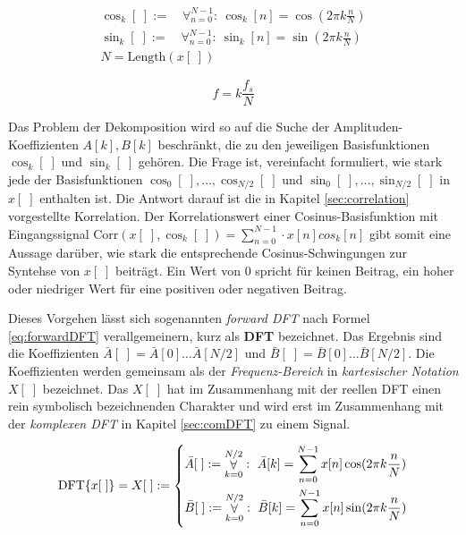\begin{equation}
\label{eq:baseFunctions}
\begin{split}
\cos_k[\;] := \quad \mathop{\forall}_{n = 0}^{N-1} :\ \cos_k[n] = \cos(2\pi k \frac{n}{N}) \\
\sin_k[\;] := \quad \mathop{\forall}_{n = 0}^{N-1} :\ \sin_k[n] = \sin(2\pi k \frac{n}{N}) \\
N = \text{Length} (x[\;] )
\end{split}
\end{equation} 

\begin{equation}
\label{eq:baseToFreq}
f = k\frac{f_s}{N} 
\end{equation} 

Das Problem der Dekomposition wird so auf die Suche der Amplituden-Koeffizienten $A[k], B[k]$ beschränkt, die zu den jeweiligen Basisfunktionen $\cos_k[\;]$ und $\sin_k[\;]$ gehören. Die Frage ist, vereinfacht formuliert, wie \glqq stark\grqq{} jede der Basisfunktionen $\cos_0[\;], \ldots ,\cos_{N/2}[\;]$ und $\sin_0[\;] ,\ldots ,\sin_{N/2}[\;]$ in $x[\;]$ enthalten ist.  Die Antwort darauf ist die in Kapitel \ref{sec:correlation} vorgestellte Korrelation. Der Korrelationswert einer Cosinus-Basisfunktion mit Eingangssignal Corr$(x[\;],\cos_k[\;]) = \sum_{n=0}^{N-1} \cdot x[n]cos_k[n]$ gibt somit eine Aussage darüber, wie stark die entsprechende Cosinus-Schwingungen zur Syntehse von $x[\;]$ beiträgt. Ein Wert von $0$ spricht für keinen Beitrag, ein hoher oder niedriger Wert für eine positiven oder negativen Beitrag. \cite[S. 157 - 158]{dspGuide}

Dieses Vorgehen lässt sich sogenannten \emph{forward DFT} nach Formel \ref{eq:forwardDFT} verallgemeinern, kurz als \textbf{DFT} bezeichnet. Das Ergebnis sind die Koeffizienten $\bar{A}[\;] = \bar{A}[0]\ldots \bar{A}[N/2]$ und $\bar{B}[\;] = \bar{B}[0] \ldots \bar{B}[N/2]$. Die Koeffizienten werden gemeinsam als der \emph{Frequenz-Bereich} in \emph{kartesischer Notation} $X[\;]$ bezeichnet. Das $X[\;]$ hat im Zusammenhang mit der reellen DFT einen rein symbolisch bezeichnenden Charakter und wird erst im Zusammenhang mit der \emph{komplexen DFT} in Kapitel \ref{sec:comDFT} zu einem Signal.  \cite[S. 158]{dspGuide}

\begin{equation}
\text{DFT}\{x[\;]\} = X[\;] :=
\begin{dcases}
\bar{A}[\;]  := \mathop{\forall}_{k = 0}^{N/2} :\ \bar{A}[k] = \sum_{n=0}^{N-1}x[n] \cos(2\pi k \frac{n}{N}) \\
 \bar{B}[\;] := \mathop{\forall}_{k = 0}^{N/2} :\ \bar{B}[k] = \sum_{n=0}^{N-1}x[n] \sin(2\pi k \frac{n}{N}) 
\end{dcases}
\label{eq:forwardDFT}
\end{equation}

